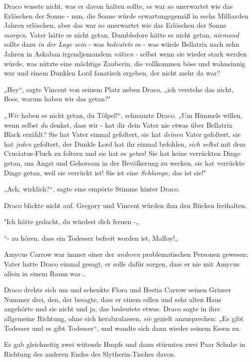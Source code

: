 {Draco wusste nicht, was er davon halten sollte, es war so unerwartet wie das Erlöschen der Sonne - nun, die Sonne würde erwartungsgemäß in sechs Milliarden Jahren erlöschen, aber das war so unerwartet wie das Erlöschen der Sonne \emph{morgen}. Vater hätte es nicht getan, Dumbledore hätte es nicht getan, \emph{niemand} sollte dazu \emph{in der Lage sein} - was \emph{bedeutete} es - was würde Bellatrix nach zehn Jahren in Askaban irgendjemandem \emph{nützen} - selbst wenn sie wieder stark werden würde, was nützte eine mächtige Zauberin, die vollkommen böse und wahnsinnig war und einem Dunklen Lord fanatisch ergeben, der nicht mehr da war?

„Hey“, sagte Vincent von seinem Platz neben Draco, „ich verstehe das nicht, Boss, warum haben wir das getan?"

„\emph{Wir} haben es nicht getan, du Tölpel!“, schnauzte Draco. „Um Himmels willen, wenn selbst \emph{du} denkst, dass wir - hat dir dein Vater nie etwas über Bellatrix Black erzählt? Sie hat Vater einmal gefoltert, sie hat \emph{deinen} Vater gefoltert, sie hat \emph{jeden} gefoltert, der Dunkle Lord hat ihr einmal befohlen, \emph{sich selbst} mit dem Cruciatus-Fluch zu foltern und sie hat es \emph{getan}! Sie hat keine verrückten Dinge getan, um Angst und Gehorsam in der Bevölkerung zu wecken, sie hat verrückte Dinge getan, weil sie verrückt ist! Sie ist eine \emph{Schlampe}, das ist sie!"

„Ach, wirklich?“, sagte eine empörte Stimme hinter Draco.

Draco blickte nicht auf. Gregory und Vincent würden ihm den Rücken freihalten.

"Ich hätte gedacht, du würdest dich freuen -„

“- zu hören, dass ein Todesser befreit worden ist, Malfoy!„

Amycus Carrow war immer einer der \emph{anderen} problematischen Personen gewesen; Vater hatte Draco einmal gesagt, er solle dafür sorgen, dass er nie mit Amycus allein in einem Raum war...

Draco drehte sich um und schenkte Flora und Hestia Carrow seinen Grinser Nummer drei, den, der besagte, dass er einem edlen und sehr alten Haus angehörte und sie nicht und ja, das bedeutete etwas. Draco sagte in ihre allgemeine Richtung, ohne sich herabzulassen, \emph{sie} gezielt anzusprechen: „Es gibt Todesser und es gibt Todesser“, und wandte sich dann wieder seinem Essen zu.

Es gab gleichzeitig zwei wütende Hmpfs und dann stürmten zwei Paar Schuhe in Richtung des anderen Endes des Slytherin-Tisches davon.

}

